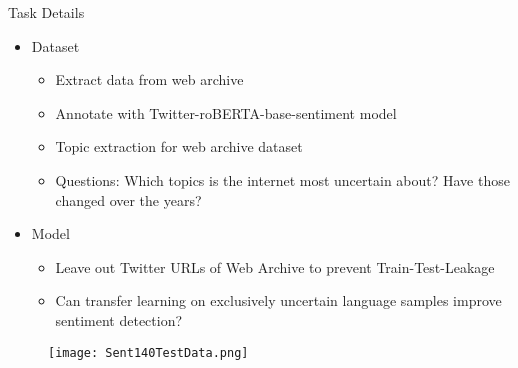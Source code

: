 \documentclass{beamer}
\begin{document}
\begin{frame}{Task Details}
	\begin{itemize}
		\item Dataset
		\begin{itemize}
			\setlength\itemsep{5pt}
			\item Extract data from web archive
			\item Annotate with Twitter-roBERTA-base-sentiment model\footnotemark
			\item Topic extraction for web archive dataset
			\item Questions: Which topics is the internet most uncertain about? Have those changed over the years?
		\end{itemize}
		\item Model
		\begin{itemize}
			\setlength\itemsep{5pt}
			\item Leave out Twitter URLs of Web Archive to prevent Train-Test-Leakage
			\item Can transfer learning on exclusively uncertain language samples improve sentiment detection?
		\end{itemize}
	\end{itemize}
\end{frame}

\begin{frame}
	\begin{figure}
		\centering
		\texttt{[image: Sent140TestData.png]}
	\end{figure}
\end{frame}
\end{document}
